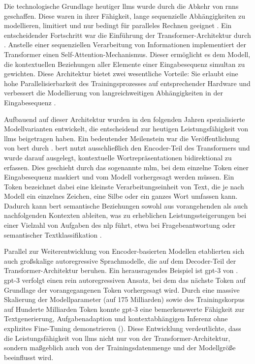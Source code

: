 Die technologische Grundlage heutiger \glspl{llm} wurde durch die Abkehr von \glspl{rnn} geschaffen.
Diese waren in ihrer Fähigkeit, lange sequenzielle Abhängigkeiten zu modellieren, limitiert und nur bedingt für paralleles Rechnen geeignet \autocite{vaswani_attention_2023}.
Ein entscheidender Fortschritt war die Einführung der Transformer-Architektur durch \citeauthor{vaswani_attention_2023} \autocite{vaswani_attention_2023}.
Anstelle einer sequenziellen Verarbeitung von Informationen implementiert der Transformer einen Self-Attention-Mechanismus.
Dieser ermöglicht es dem Modell, die kontextuellen Beziehungen aller Elemente einer Eingabesequenz simultan zu gewichten.
Diese Architektur bietet zwei wesentliche Vorteile: Sie erlaubt eine hohe Parallelisierbarkeit des Trainingsprozesses auf entsprechender Hardware und verbessert die Modellierung von langreichweitigen Abhängigkeiten in der Eingabesequenz \autocite{vaswani_attention_2023}.

Aufbauend auf dieser Architektur wurden in den folgenden Jahren spezialisierte Modellvarianten entwickelt, die entscheidend zur heutigen Leistungsfähigkeit von \glspl{llm} beigetragen haben.
Ein bedeutender Meilenstein war die Veröffentlichung von \gls{bert} durch \citeauthor{devlin_bert_2019} \autocite{devlin_bert_2019}.
\gls{bert} nutzt ausschließlich den Encoder-Teil des Transformers und wurde darauf ausgelegt, kontextuelle Wortrepräsentationen bidirektional zu erfassen.
Dies geschieht durch das sogenannte \gls{mlm}, bei dem einzelne Token einer Eingabesequenz maskiert und vom Modell vorhergesagt werden müssen.
Ein Token bezeichnet dabei eine kleinste Verarbeitungseinheit von Text, die je nach Modell ein einzelnes Zeichen, eine Silbe oder ein ganzes Wort umfassen kann.
Dadurch kann \gls{bert} semantische Beziehungen sowohl aus vorangehenden als auch nachfolgenden Kontexten ableiten, was zu erheblichen Leistungssteigerungen bei einer Vielzahl von Aufgaben des \gls{nlp} führt, etwa bei Fragebeantwortung oder semantischer Textklassifikation \autocite{devlin_bert_2019}.

Parallel zur Weiterentwicklung von Encoder-basierten Modellen etablierten sich auch großskalige autoregressive Sprachmodelle, die auf dem Decoder-Teil der Transformer-Architektur beruhen.
Ein herausragendes Beispiel ist \gls{gpt}-3 von \citeauthor{brown_language_2020} \autocite{brown_language_2020}.
\gls{gpt}-3 verfolgt einen rein autoregressiven Ansatz, bei dem das nächste Token auf Grundlage der vorangegangenen Token vorhergesagt wird.
Durch eine massive Skalierung der Modellparameter (auf 175 Milliarden) sowie des Trainingskorpus auf Hunderte Milliarden Token konnte \gls{gpt}-3 eine bemerkenswerte Fähigkeit zur Textgenerierung, Aufgabenadaption und kontextabhängigen Inferenz ohne explizites Fine-Tuning demonstrieren ().
Diese Entwicklung verdeutlichte, dass die Leistungsfähigkeit von \glspl{llm} nicht nur von der Transformer-Architektur, sondern maßgeblich auch von der Trainingsdatenmenge und der Modellgröße beeinflusst wird.


